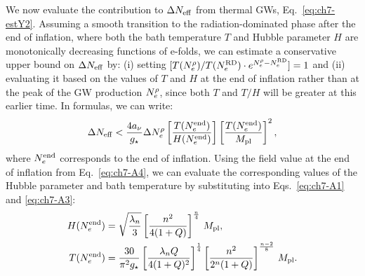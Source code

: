 We now evaluate the contribution to $\Delta N_{\rm eff}$ from thermal GWs, Eq.~\eqref{eq:ch7-estY2}. Assuming a smooth transition to the radiation-dominated phase after the end of inflation, where both the bath temperature $T$ and Hubble parameter $H$ are monotonically decreasing functions of e-folds, we can estimate a conservative upper bound on $\Delta N_{\rm eff}$ by: (i) setting $[T(N_e^\rho)/T(N_e^{\rm RD}) \cdot e^{N_e^\rho - N_e^{\rm RD}}] = 1$ and (ii) evaluating it based on the values of $T$ and $H$ at the end of inflation rather than at the peak of the GW production $N_e^{\rm \rho}$, since both $T$ and $T/H$ will be greater at this earlier time. In formulas, we can write:
\begin{equation}
    \Delta N_{\rm eff}< \frac{4a_\nu}{g_\star}\Delta N_e^\rho\left[\frac{T(N_e^{\rm end})}{ H(N_e^{\rm end})}\right]\left[\frac{T(N_e^{\rm end})}{ M_{\rm pl}}\right]^2,
\end{equation}
where $N_e^{\rm end}$ corresponds to the end of inflation. Using the field value at the end of inflation from Eq.~\eqref{eq:ch7-A4}, we can evaluate the corresponding values of the Hubble parameter and bath temperature by substituting into Eqs.~\eqref{eq:ch7-A1} and \eqref{eq:ch7-A3}:
\begin{align}
    H(N_e^{\rm end}) &= \sqrt{\frac{\lambda_n}{3}}\left[\frac{n^2}{4(1+Q)}\right]^{\frac{n}{4}}\,M_{\rm pl}, \\
T(N_e^{\rm end}) &= \frac{30}{\pi^2g_\star}\left[\frac{\lambda_n Q}{4(1+Q)^2}\right]^{\frac{1}{4}}\left[\frac{n^2}{2^n(1+Q)}\right]^{\frac{n-2}{8}}\,M_{\rm pl}.
\end{align}

